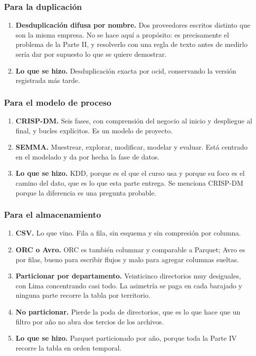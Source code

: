 \documentclass[11pt]{article}
\begin{document}
\subsubsection*{Para la duplicación}
\begin{enumerate}
  \item \textbf{Desduplicación difusa por nombre.} Dos proveedores escritos distinto que son la misma empresa. No se hace aquí a propósito: es precisamente el problema de la Parte II, y resolverlo con una regla de texto antes de medirlo sería dar por supuesto lo que se quiere demostrar.
  \item \textbf{Lo que se hizo.} Desduplicación exacta por ocid, conservando la versión registrada más tarde.
\end{enumerate}
\subsubsection*{Para el modelo de proceso}
\begin{enumerate}
  \item \textbf{CRISP-DM.} Seis fases, con comprensión del negocio al inicio y despliegue al final, y bucles explícitos. Es un modelo de proyecto.
  \item \textbf{SEMMA.} Muestrear, explorar, modificar, modelar y evaluar. Está centrado en el modelado y da por hecha la fase de datos.
  \item \textbf{Lo que se hizo.} KDD, porque es el que el curso usa y porque su foco es el camino del dato, que es lo que esta parte entrega. Se menciona CRISP-DM porque la diferencia es una pregunta probable.
\end{enumerate}
\subsubsection*{Para el almacenamiento}
\begin{enumerate}
  \item \textbf{CSV.} Lo que vino. Fila a fila, sin esquema y sin compresión por columna.
  \item \textbf{ORC o Avro.} ORC es también columnar y comparable a Parquet; Avro es por filas, bueno para escribir flujos y malo para agregar columnas sueltas.
  \item \textbf{Particionar por departamento.} Veinticinco directorios muy desiguales, con Lima concentrando casi todo. La asimetría se paga en cada barajado y ninguna parte recorre la tabla por territorio.
  \item \textbf{No particionar.} Pierde la poda de directorios, que es lo que hace que un filtro por año no abra dos tercios de los archivos.
  \item \textbf{Lo que se hizo.} Parquet particionado por año, porque toda la Parte IV recorre la tabla en orden temporal.
\end{enumerate}
\end{document}

